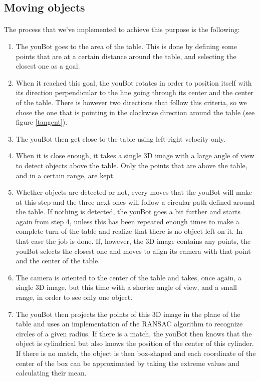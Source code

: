 \documentclass[12pt,a4paper]{article}
\begin{document}
\subsection{Moving objects}

\paragraph{} 
The process that we've implemented to achieve this purpose is the following:
\begin{enumerate}
\item The youBot goes to the area of the table. This is done by defining some points that are at a certain distance around the table, and selecting the closest one as a goal.
\item When it reached this goal, the youBot rotates in order to position itself with its direction perpendicular to the line going through its center and the center of the table. There is however two directions that follow this criteria, so we chose the one that is pointing in the clockwise direction around the table (see figure \ref{tangent}).
\item The youBot then get close to the table using left-right velocity only.
\item When it is close enough, it takes a single 3D image with a large angle of view to detect objects above the table. Only the points that are above the table, and in a certain range, are kept.
\item Whether objects are detected or not, every moves that the youBot will make at this step and the three next ones will follow a circular path defined around the table. If nothing is detected, the youBot goes a bit further and starts again from step 4, unless this has been repeated enough times to make a complete turn of the table and realize that there is no object left on it. In that case the job is done. If, however, the 3D image contains any points, the youBot selects the closest one and moves to align its camera with that point and the center of the table.
\item The camera is oriented to the center of the table and takes, once again, a single 3D image, but this time with a shorter angle of view, and a small range, in order to see only one object.
\item The youBot then projects the points of this 3D image in the plane of the table and uses an implementation of the RANSAC algorithm\cite{RANSAC} to recognize circles of a given radius. If there is a match, the youBot then knows that the object is cylindrical but also knows the position of the center of this cylinder. If there is no match, the object is then box-shaped and each coordinate of the center of the box can be approximated by taking the extreme values and calculating their mean. 

\end{enumerate}
\end{document}
